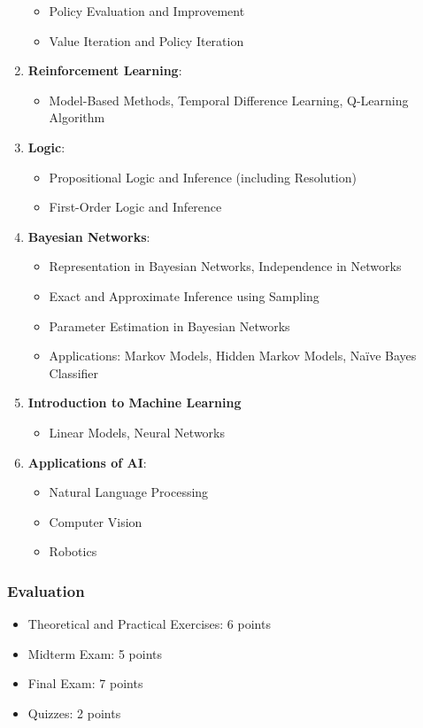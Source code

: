 \documentclass[12pt]{article}
\begin{document}
\begin{enumerate}
    \begin{itemize}
        \item Policy Evaluation and Improvement
        \item Value Iteration and Policy Iteration
    \end{itemize}
    \item \textbf{Reinforcement Learning}:
    \begin{itemize}
        \item Model-Based Methods, Temporal Difference Learning, Q-Learning Algorithm
    \end{itemize}
    \item \textbf{Logic}:
    \begin{itemize}
        \item Propositional Logic and Inference (including Resolution)
        \item First-Order Logic and Inference
    \end{itemize}
    \item \textbf{Bayesian Networks}:
    \begin{itemize}
        \item Representation in Bayesian Networks, Independence in Networks
        \item Exact and Approximate Inference using Sampling
        \item Parameter Estimation in Bayesian Networks
        \item Applications: Markov Models, Hidden Markov Models, Naïve Bayes Classifier
    \end{itemize}
    \item \textbf{Introduction to Machine Learning}
    \begin{itemize}
        \item Linear Models, Neural Networks
    \end{itemize}
    \item \textbf{Applications of AI}:
    \begin{itemize}
        \item Natural Language Processing
        \item Computer Vision
        \item Robotics
    \end{itemize}
\end{enumerate}

\subsubsection*{Evaluation}
\begin{itemize}
    \item Theoretical and Practical Exercises: 6 points
    \item Midterm Exam: 5 points
    \item Final Exam: 7 points
    \item Quizzes: 2 points
\end{itemize}
\end{document}
